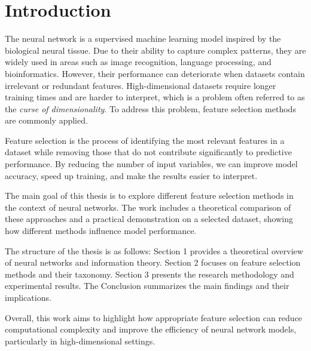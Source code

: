 \chapter*{Introduction}
The neural network is a supervised machine learning model inspired by the biological neural tissue. Due to their ability to capture complex patterns, they are widely used in areas such as image recognition, language processing, and bioinformatics. However, their performance can deteriorate when datasets contain irrelevant or redundant features. High-dimensional datasets require longer training times and are harder to interpret, which is a problem often referred to as the \textit{curse of dimensionality}. To address this problem, feature selection methods are commonly applied.

Feature selection is the process of identifying the most relevant features in a dataset while removing those that do not contribute significantly to predictive performance. By reducing the number of input variables, we can improve model accuracy, speed up training, and make the results easier to interpret. 

The main goal of this thesis is to explore different feature selection methods in the context of neural networks. The work includes a theoretical comparison of these approaches and a practical demonstration on a selected dataset, showing how different methods influence model performance.

The structure of the thesis is as follows: Section 1 provides a theoretical overview of neural networks and information theory. Section 2 focuses on feature selection methods and their taxonomy. Section 3 presents the research methodology and experimental results. The Conclusion summarizes the main findings and their implications.

Overall, this work aims to highlight how appropriate feature selection can reduce computational complexity and improve the efficiency of neural network models, particularly in high-dimensional settings.
